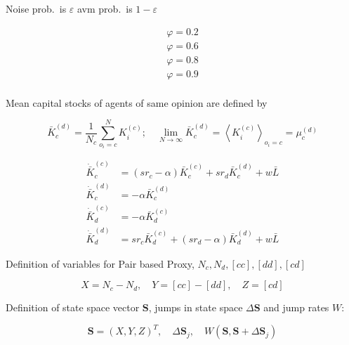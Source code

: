 Noise prob.\ is $\varepsilon$  avm prob.\ is $1 - \varepsilon$

\begin{align}
	\varphi = 0.2 \\ 
	\varphi = 0.6 \\ 
	\varphi = 0.8 \\ 
	\varphi = 0.9 \\ 
\end{align}

Mean capital stocks of agents of same opinion are defined by

\begin{equation}
	\bar{K}_c^{(d)} = \frac{1}{N_c} \sum_{o_i = c}^{N} K_i^{(c)}; \quad \lim_{N \rightarrow \infty} \bar{K}_c^{(d)} = \left< K_i^{(c)} \right>_{o_i=c} = \mu_c^{(d)}
\end{equation}

\begin{align}
	\dot{\bar{K}}_c^{(c)} &= (sr_c - \alpha)\bar{K}_c^{(c)} + s r_d \bar{K}_c^{(d)} + w \bar{L} \nonumber \\
	\dot{\bar{K}}_c^{(d)} &= - \alpha\bar{K}_c^{(d)} \nonumber \\
	\dot{\bar{K}}_d^{(c)} &= - \alpha\bar{K}_d^{(c)} \nonumber \\
	\dot{\bar{K}}_d^{(d)} &= sr_c \bar{K}_d^{(c)} + (s r_d - \alpha)\bar{K}_d^{(d)} + w \bar{L} \nonumber
\end{align}

Definition of variables for Pair based Proxy, $N_c, N_d, [cc], [dd], [cd]$

\begin{equation}
	X = N_c - N_d, \quad Y = [cc] - [dd], \quad Z = [cd]
\end{equation}

Definition of state space vector $\mathbf{S}$, jumps in state space $\Delta \mathbf{S}$ and jump rates $W$:

\begin{equation}
	\mathbf{S} = (X, Y, Z)^T, \quad \Delta \mathbf{S}_j, \quad W(\mathbf{S},\mathbf{S} + \Delta \mathbf{S}_j)
\end{equation}

